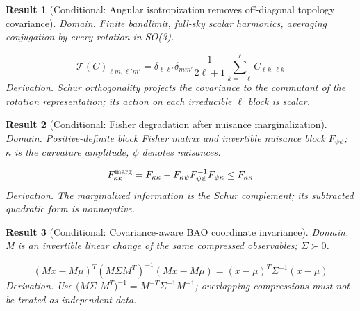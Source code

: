 \documentclass[aps,prd,onecolumn,notitlepage,groupedaddress,11pt]{revtex4-2}
\newtheorem{result}{Result}
\begin{document}
\begin{result}[\textsf{Conditional}: Angular isotropization removes off-diagonal topology covariance]\label{bridge:40}
\textit{Domain.} Finite bandlimit, full-sky scalar harmonics, averaging conjugation by every rotation in SO(3).\par
\begin{equation}\label{bridgeeq:40}
\mathcal T(C)_{\ell m,\ell\prime m\prime}=\delta_{\ell\ell\prime}\delta_{mm\prime}\frac{1}{2\ell+1}\sum_{k=-\ell}^{\ell}C_{\ell k,\ell k}
\end{equation}
\textit{Derivation.} Schur orthogonality projects the covariance to the commutant of the rotation representation; its action on each irreducible \(\ell\) block is scalar.
\end{result}
\begin{result}[\textsf{Conditional}: Fisher degradation after nuisance marginalization]\label{bridge:41}
\textit{Domain.} Positive-definite block Fisher matrix and invertible nuisance block \(F_{\psi\psi}\); \(\kappa\) is the curvature amplitude, \(\psi\) denotes nuisances.\par
\begin{equation}\label{bridgeeq:41}
F_{\kappa\kappa}^{\rm marg}=F_{\kappa\kappa}-F_{\kappa\psi}F_{\psi\psi}^{-1}F_{\psi\kappa}\le F_{\kappa\kappa}
\end{equation}
\textit{Derivation.} The marginalized information is the Schur complement; its subtracted quadratic form is nonnegative.
\end{result}
\begin{result}[\textsf{Conditional}: Covariance-aware BAO coordinate invariance]\label{bridge:42}
\textit{Domain.} M is an invertible linear change of the same compressed observables; \(\Sigma\succ0\).\par
\begin{equation}\label{bridgeeq:42}
(Mx-M\mu)^T(M\Sigma M^T)^{-1}(Mx-M\mu)=(x-\mu)^T\Sigma^{-1}(x-\mu)
\end{equation}
\textit{Derivation.} Use \((M\Sigma\) \(M^T)^{-1}=M^{-T}\Sigma^{-1}M^{-1}\); overlapping compressions must not be treated as independent data.
\end{result}
\end{document}
